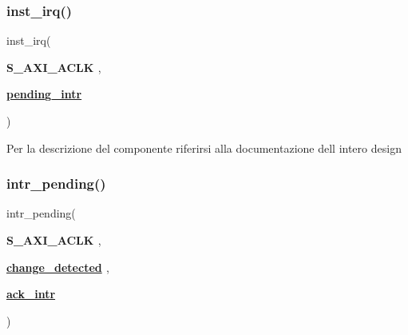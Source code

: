 \subsubsection{\texorpdfstring{inst\+\_\+irq()}{inst\_irq()}}
{\footnotesize\ttfamily  {\bfseries \textcolor{vhdlchar}{ }} inst\+\_\+irq(\begin{DoxyParamCaption}\item[{}]{{\bfseries \textcolor{vhdlchar}{S\+\_\+\+A\+X\+I\+\_\+\+A\+C\+LK}\textcolor{vhdlchar}{ }} {\em } ,  }\item[{}]{{\bfseries {\bfseries \hyperlink{classGPIO__v1__0__S00__AXI_1_1arch__imp_a0bf0e620e2340340488f0616eae3242a}{pending\+\_\+intr}} \textcolor{vhdlchar}{ }} {\em } }\end{DoxyParamCaption})\hspace{0.3cm}{\ttfamily [Process]}}

Per la descrizione del componente riferirsi alla documentazione dell\textquotesingle{} intero design \mbox{\label{classGPIO__v1__0__S00__AXI_1_1arch__imp_a72db935ad9e80a3434cfb113c364c329}} 
\subsubsection{\texorpdfstring{intr\+\_\+pending()}{intr\_pending()}}
{\footnotesize\ttfamily  {\bfseries \textcolor{vhdlchar}{ }} intr\+\_\+pending(\begin{DoxyParamCaption}\item[{}]{{\bfseries \textcolor{vhdlchar}{S\+\_\+\+A\+X\+I\+\_\+\+A\+C\+LK}\textcolor{vhdlchar}{ }} {\em } ,  }\item[{}]{{\bfseries {\bfseries \hyperlink{classGPIO__v1__0__S00__AXI_1_1arch__imp_aab51abc2eb680c6f972e0d63ab4fc591}{change\+\_\+detected}} \textcolor{vhdlchar}{ }} {\em } ,  }\item[{}]{{\bfseries {\bfseries \hyperlink{classGPIO__v1__0__S00__AXI_1_1arch__imp_a0d3233e5bd28024e266252af0b862923}{ack\+\_\+intr}} \textcolor{vhdlchar}{ }} {\em } }\end{DoxyParamCaption})\hspace{0.3cm}{\ttfamily [Process]}}




